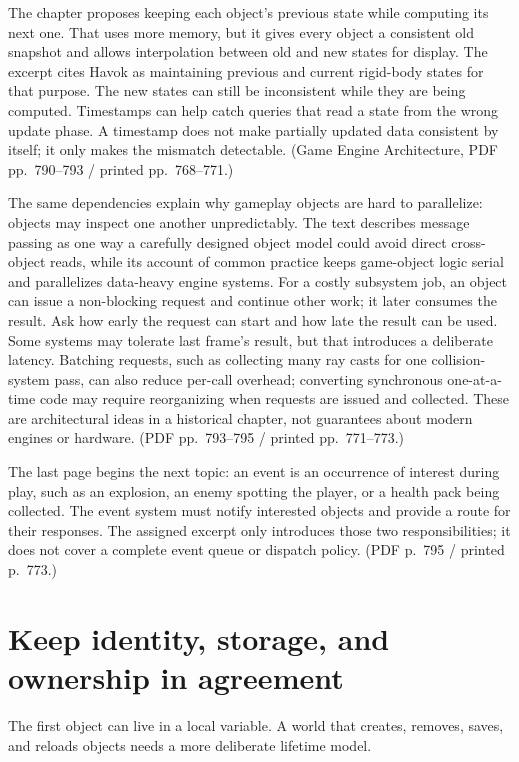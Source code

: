 The chapter proposes keeping each object's previous state while computing its next one. That uses more memory, but it gives every object a consistent old snapshot and allows interpolation between old and new states for display. The excerpt cites Havok as maintaining previous and current rigid-body states for that purpose. The new states can still be inconsistent while they are being computed. Timestamps can help catch queries that read a state from the wrong update phase. A timestamp does not make partially updated data consistent by itself; it only makes the mismatch detectable. (Game Engine Architecture, PDF pp.~790--793 / printed pp.~768--771.)

The same dependencies explain why gameplay objects are hard to parallelize: objects may inspect one another unpredictably. The text describes message passing as one way a carefully designed object model could avoid direct cross-object reads, while its account of common practice keeps game-object logic serial and parallelizes data-heavy engine systems. For a costly subsystem job, an object can issue a non-blocking request and continue other work; it later consumes the result. Ask how early the request can start and how late the result can be used. Some systems may tolerate last frame's result, but that introduces a deliberate latency. Batching requests, such as collecting many ray casts for one collision-system pass, can also reduce per-call overhead; converting synchronous one-at-a-time code may require reorganizing when requests are issued and collected. These are architectural ideas in a historical chapter, not guarantees about modern engines or hardware. (PDF pp.~793--795 / printed pp.~771--773.)

The last page begins the next topic: an event is an occurrence of interest during play, such as an explosion, an enemy spotting the player, or a health pack being collected. The event system must notify interested objects and provide a route for their responses. The assigned excerpt only introduces those two responsibilities; it does not cover a complete event queue or dispatch policy. (PDF p.~795 / printed p.~773.)

\section{Keep identity, storage, and ownership in agreement}\label{05-engine-i-ch014-keep-identity-storage-and-ownership-in-agreement}

The first object can live in a local variable. A world that creates, removes, saves, and reloads objects needs a more deliberate lifetime model.

